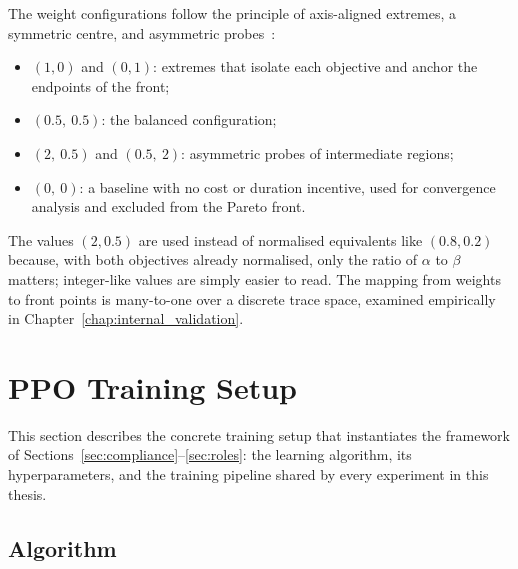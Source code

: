 The weight configurations follow the principle of axis-aligned
extremes, a symmetric centre, and asymmetric
probes~\cite{DasNormalBoundaryIntersection1998}:

\begin{itemize}
  \item $(1,0)$ and $(0,1)$: extremes that isolate each objective and
        anchor the endpoints of the front;
  \item $(0.5,\ 0.5)$: the balanced configuration;
  \item $(2,\ 0.5)$ and $(0.5,\ 2)$: asymmetric probes of
        intermediate regions;
  \item $(0,\ 0)$: a baseline with no cost or duration incentive,
        used for convergence analysis and excluded from the Pareto
        front.
\end{itemize}

The values $(2, 0.5)$ are used instead of normalised equivalents like
$(0.8, 0.2)$ because, with both objectives already normalised, only
the ratio of $\alpha$ to $\beta$ matters; integer-like values are
simply easier to read. The mapping from weights to front points is
many-to-one over a discrete trace space, examined empirically in
Chapter~\ref{chap:internal_validation}.


\section{PPO Training Setup}
\label{sec:ppo}

This section describes the concrete training setup that instantiates
the framework of Sections~\ref{sec:compliance}--\ref{sec:roles}: the
learning algorithm, its hyperparameters, and the training pipeline
shared by every experiment in this thesis.

\subsection{Algorithm}
\label{sec:ppo_algorithm}


